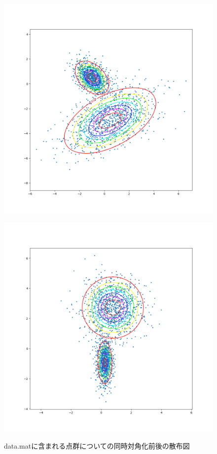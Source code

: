 \documentclass[dvipdfmx, fleqn]{jsarticle}
\begin{document}
\begin{figure}
	\begin{minipage}[b]{0.45\linewidth}
		\centering
		\includegraphics[clip, width=\linewidth]{../figures/scatter_before_2}
		\label{fig:scatter_before_2}
	\end{minipage}
	\begin{minipage}[b]{0.45\linewidth}
		\centering
		\includegraphics[clip, width=\linewidth]{../figures/scatter_after_2}
		\label{fig:scatter_after_2}
	\end{minipage}
	\caption{data.matに含まれる点群についての同時対角化前後の散布図}
	\label{fig:data2.mat_result}
\end{figure}
\end{document}
